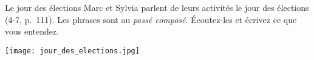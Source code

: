 \begin{frame}{Le jour des élections}
  Marc et Sylvia parlent de leurs activités le jour des élections (4-7, p.~111).
  Les phrases sont au \emph{passé composé}.
  Écoutez-les et écrivez ce que vous entendez.
  \begin{center}
    \texttt{[image: jour\_des\_elections.jpg]}
  \end{center}
\end{frame}